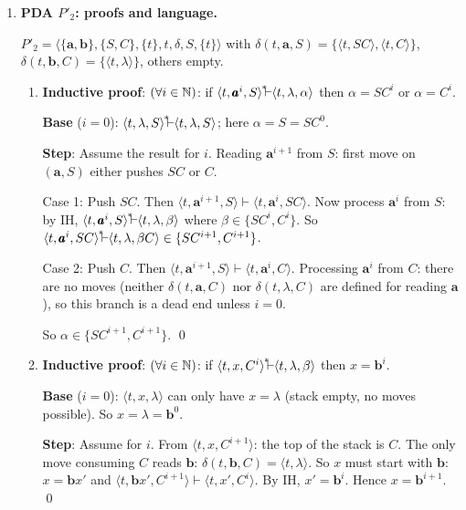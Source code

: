 \begin{enumerate}[{10.}1. ]
\item \textbf{PDA $P'_2$: proofs and language.}

$P'_2 = \langle\{\pmb{a},\pmb{b}\},\{S,C\},\{t\},t,\delta,S,\{t\}\rangle$ with $\delta(t,\pmb{a},S) = \{\langle t,SC\rangle,\langle t,C\rangle\}$, $\delta(t,\pmb{b},C) = \{\langle t,\lambda\rangle\}$, others empty.

\begin{enumerate}
\item \textbf{Inductive proof}: $(\forall i\in\mathbb{N})$: if $\langle t,\pmb{a}^i,S\rangle\Dvdash\langle t,\lambda,\alpha\rangle$ then $\alpha = SC^i$ or $\alpha = C^i$.

\textbf{Base} ($i=0$): $\langle t,\lambda,S\rangle\Dvdash\langle t,\lambda,S\rangle$; here $\alpha=S=SC^0$. \checkmark

\textbf{Step}: Assume the result for $i$. Reading $\pmb{a}^{i+1}$ from $S$: first move on $(\pmb{a},S)$ either pushes $SC$ or $C$.

Case 1: Push $SC$. Then $\langle t,\pmb{a}^{i+1},S\rangle\vdash\langle t,\pmb{a}^i,SC\rangle$. Now process $\pmb{a}^i$ from $S$: by IH, $\langle t,\pmb{a}^i,S\rangle\Dvdash\langle t,\lambda,\beta\rangle$ where $\beta\in\{SC^i,C^i\}$. So $\langle t,\pmb{a}^i,SC\rangle\Dvdash\langle t,\lambda,\beta C\rangle\in\{SC^{i+1},C^{i+1}\}$.

Case 2: Push $C$. Then $\langle t,\pmb{a}^{i+1},S\rangle\vdash\langle t,\pmb{a}^i,C\rangle$. Processing $\pmb{a}^i$ from $C$: there are no moves (neither $\delta(t,\pmb{a},C)$ nor $\delta(t,\lambda,C)$ are defined for reading $\pmb{a}$), so this branch is a dead end unless $i=0$.

So $\alpha\in\{SC^{i+1},C^{i+1}\}$. \qed

\item \textbf{Inductive proof}: $(\forall i\in\mathbb{N})$: if $\langle t,x,C^i\rangle\Dvdash\langle t,\lambda,\beta\rangle$ then $x=\pmb{b}^i$.

\textbf{Base} ($i=0$): $\langle t,x,\lambda\rangle$ can only have $x=\lambda$ (stack empty, no moves possible). So $x=\lambda=\pmb{b}^0$. \checkmark

\textbf{Step}: Assume for $i$. From $\langle t,x,C^{i+1}\rangle$: the top of the stack is $C$. The only move consuming $C$ reads $\pmb{b}$: $\delta(t,\pmb{b},C)=\langle t,\lambda\rangle$. So $x$ must start with $\pmb{b}$: $x=\pmb{b}x'$ and $\langle t,\pmb{b}x',C^{i+1}\rangle\vdash\langle t,x',C^i\rangle$. By IH, $x'=\pmb{b}^i$. Hence $x=\pmb{b}^{i+1}$. \qed


\end{enumerate}
\end{enumerate}
